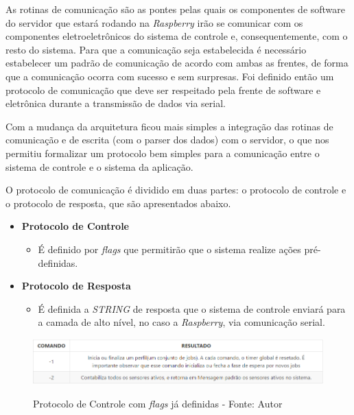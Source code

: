 As rotinas de comunicação são as pontes pelas quais os componentes de software do servidor que estará rodando na \textit{Raspberry} irão se
comunicar com os componentes eletroeletrônicos do sistema de controle e, consequentemente, com o resto do sistema. 
Para que a comunicação seja estabelecida é necessário estabelecer um padrão de comunicação de acordo com ambas as frentes, de forma que a comunicação 
ocorra com sucesso e sem surpresas. Foi definido então um protocolo de comunicação que deve ser respeitado pela frente de software e
eletrônica durante a transmissão de dados via serial.

Com a mudança da arquitetura ficou mais simples a integração das rotinas de comunicação e de escrita (com o parser dos dados) com o
servidor, o que nos permitiu formalizar um protocolo bem simples para a comunicação entre o sistema de controle e o sistema da aplicação.

O protocolo de comunicação é dividido em duas partes: o protocolo de controle e o protocolo de resposta, que são apresentados abaixo.

\begin{itemize}
    \item \textbf{Protocolo de Controle}
    \begin{itemize}
        \item É definido por \textit{flags} que permitirão que o sistema realize ações pré-definidas.
    \end{itemize}
    \item \textbf{Protocolo de Resposta}
    \begin{itemize}
        \item É definida a \textit{STRING} de resposta que o sistema de controle enviará para a camada de alto nível, no caso a \textit{Raspberry}, via 
        comunicação serial.
    \end{itemize}
\end{itemize}

\begin{figure}[H]
\centering
\includegraphics[keepaspectratio=true,scale=0.7]{figuras/protocolo_controle.png}
\label{fig:protocolo_controle}
\caption{Protocolo de Controle com \textit{flags} já definidas - Fonte: Autor}
\end{figure}


